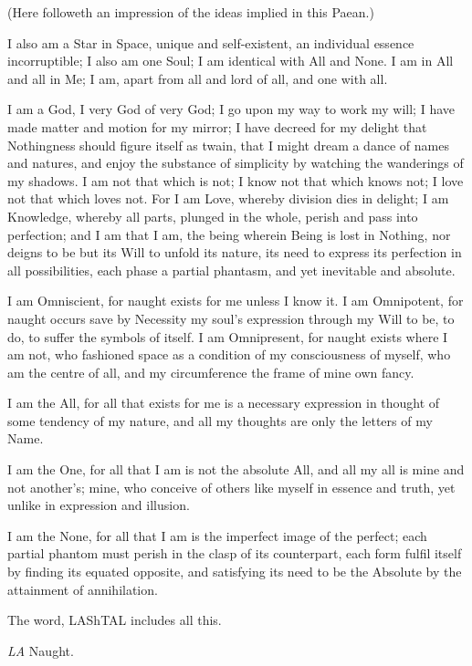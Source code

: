 \raggedbottom\pagebreak

(Here followeth an impression of the ideas implied in this Paean.)


I also am a Star in Space, unique and self-existent, an individual
essence incorruptible; I also am one Soul; I am identical with All
and None. I am in All and all in Me; I am, apart from all and
lord of all, and one with all.

I am a God, I very God of very God; I go upon my way to work my will; I have made matter and motion for my mirror; I have decreed for my delight that Nothingness should figure itself as twain, that I might dream a dance of names and natures, and enjoy the substance of simplicity by watching the wanderings of my shadows. I am not that which is not; I know not that which knows not; I love not that which loves not. For I am Love, whereby division dies in delight; I am Knowledge, whereby all parts, plunged in the whole, perish and pass into perfection; and I am that I am, the being wherein Being is lost in Nothing, nor deigns to be but its Will to unfold its nature, its need to express its perfection in all possibilities, each phase a partial phantasm, and yet inevitable and absolute.

I am Omniscient, for naught exists for me unless I know it. I am Omnipotent, for naught occurs save by Necessity my soul's expression through my Will to be, to do, to suffer the symbols of itself. I am Omnipresent, for naught exists where I am not, who fashioned space as a condition of my consciousness of myself, who am the centre of all, and my circumference the frame of mine own fancy.

I am the All, for all that exists for me is a necessary expression in thought of some tendency of my nature, and all my thoughts are only the letters of my Name.

I am the One, for all that I am is not the absolute All, and all my all is mine and not another's; mine, who conceive of others like myself in essence and truth, yet unlike in expression and illusion.

I am the None, for all that I am is the imperfect image of the perfect; each partial phantom must perish in the clasp of its counterpart, each form fulfil itself by finding its equated opposite, and satisfying its need to be the Absolute by the attainment of annihilation.

The word, LAShTAL includes all this.

\textit{LA} \textemdash{} Naught.

